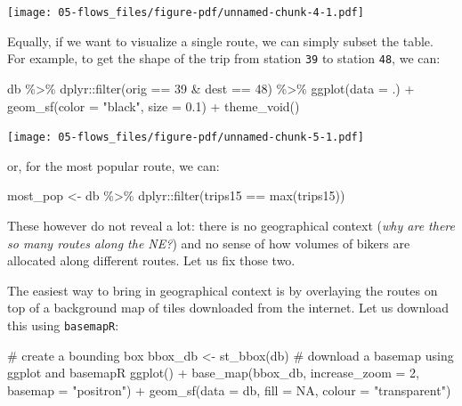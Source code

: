 \documentclass[
  letterpaper,
  DIV=11,
  numbers=noendperiod,
  oneside]{scrreprt}
\newenvironment{Shaded}{\begin{snugshade}}{\end{snugshade}}
\newcommand{\AttributeTok}[1]{\textcolor[rgb]{0.40,0.45,0.13}{#1}}
\newcommand{\CommentTok}[1]{\textcolor[rgb]{0.37,0.37,0.37}{#1}}
\newcommand{\ConstantTok}[1]{\textcolor[rgb]{0.56,0.35,0.01}{#1}}
\newcommand{\DecValTok}[1]{\textcolor[rgb]{0.68,0.00,0.00}{#1}}
\newcommand{\FloatTok}[1]{\textcolor[rgb]{0.68,0.00,0.00}{#1}}
\newcommand{\FunctionTok}[1]{\textcolor[rgb]{0.28,0.35,0.67}{#1}}
\newcommand{\NormalTok}[1]{\textcolor[rgb]{0.00,0.23,0.31}{#1}}
\newcommand{\OtherTok}[1]{\textcolor[rgb]{0.00,0.23,0.31}{#1}}
\newcommand{\SpecialCharTok}[1]{\textcolor[rgb]{0.37,0.37,0.37}{#1}}
\newcommand{\StringTok}[1]{\textcolor[rgb]{0.13,0.47,0.30}{#1}}
\begin{document}
\texttt{[image: 05-flows\_files/figure-pdf/unnamed-chunk-4-1.pdf]}

Equally, if we want to visualize a single route, we can simply subset
the table. For example, to get the shape of the trip from station
\texttt{39} to station \texttt{48}, we can:

\begin{Shaded}
\begin{Highlighting}[]
\NormalTok{db }\SpecialCharTok{\%\textgreater{}\%} 
\NormalTok{  dplyr}\SpecialCharTok{::}\FunctionTok{filter}\NormalTok{(orig }\SpecialCharTok{==} \DecValTok{39} \SpecialCharTok{\&}\NormalTok{ dest }\SpecialCharTok{==} \DecValTok{48}\NormalTok{) }\SpecialCharTok{\%\textgreater{}\%} 
  \FunctionTok{ggplot}\NormalTok{(}\AttributeTok{data =}\NormalTok{ .) }\SpecialCharTok{+} 
  \FunctionTok{geom\_sf}\NormalTok{(}\AttributeTok{color =} \StringTok{"black"}\NormalTok{, }
          \AttributeTok{size =} \FloatTok{0.1}\NormalTok{) }\SpecialCharTok{+}
  \FunctionTok{theme\_void}\NormalTok{()}
\end{Highlighting}
\end{Shaded}

\texttt{[image: 05-flows\_files/figure-pdf/unnamed-chunk-5-1.pdf]}

or, for the most popular route, we can:

\begin{Shaded}
\begin{Highlighting}[]
\NormalTok{most\_pop }\OtherTok{\textless{}{-}}\NormalTok{ db }\SpecialCharTok{\%\textgreater{}\%} 
\NormalTok{  dplyr}\SpecialCharTok{::}\FunctionTok{filter}\NormalTok{(trips15 }\SpecialCharTok{==} \FunctionTok{max}\NormalTok{(trips15))}
\end{Highlighting}
\end{Shaded}

These however do not reveal a lot: there is no geographical context
(\emph{why are there so many routes along the NE?}) and no sense of how
volumes of bikers are allocated along different routes. Let us fix those
two.

The easiest way to bring in geographical context is by overlaying the
routes on top of a background map of tiles downloaded from the internet.
Let us download this using \texttt{basemapR}:

\begin{Shaded}
\begin{Highlighting}[]
\CommentTok{\# create a bounding box}
\NormalTok{bbox\_db }\OtherTok{\textless{}{-}} \FunctionTok{st\_bbox}\NormalTok{(db)}
\CommentTok{\# download a basemap using ggplot and basemapR}
\FunctionTok{ggplot}\NormalTok{() }\SpecialCharTok{+}
  \FunctionTok{base\_map}\NormalTok{(bbox\_db, }\AttributeTok{increase\_zoom =} \DecValTok{2}\NormalTok{, }\AttributeTok{basemap =} \StringTok{"positron"}\NormalTok{) }\SpecialCharTok{+}
  \FunctionTok{geom\_sf}\NormalTok{(}\AttributeTok{data =}\NormalTok{ db, }\AttributeTok{fill =} \ConstantTok{NA}\NormalTok{, }\AttributeTok{colour =} \StringTok{"transparent"}\NormalTok{) }
\end{Highlighting}
\end{Shaded}
\end{document}
